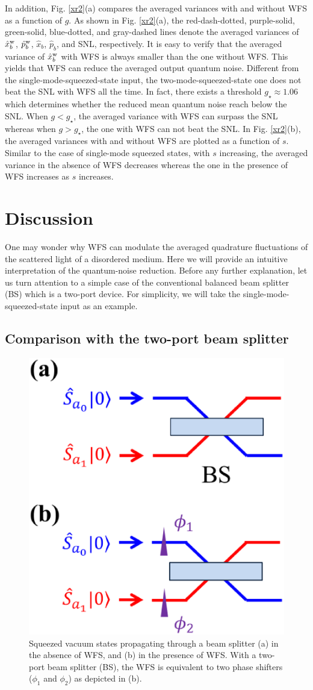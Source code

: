 \documentclass[9pt,twocolumn,twoside]{osajnl}
\begin{document}
In addition, Fig. \ref{xr2}(a) compares the averaged variances with and without WFS as a function of $g$. As shown in Fig. \ref{xr2}(a), the red-dash-dotted, purple-solid, green-solid, blue-dotted, and gray-dashed lines denote the averaged variances of $\hat{x}_b^{\rm{w}}$, $\hat{p}_b^{\rm{w}}$, $\hat{x}_b$, $\hat{p}_b$, and SNL, respectively. It is easy to verify that the averaged variance of $\hat{x}_b^{\rm{w}}$ with WFS is always smaller than the one without WFS. This yields that WFS can reduce the averaged output quantum noise. Different from the single-mode-squeezed-state input, the two-mode-squeezed-state one does not beat the SNL with WFS all the time. In fact, there exists a threshold $g_{\star} \approx 1.06$ which determines whether the reduced mean quantum noise reach below the SNL. When $g < g_{\star}$, the averaged variance with WFS can surpass the SNL whereas when $g > g_{\star}$, the one with WFS can not beat the SNL. In Fig. \ref{xr2}(b), the averaged variances with and without WFS are plotted as a function of $s$. Similar to the case of single-mode squeezed states, with $s$ increasing, the averaged variance in the absence of WFS decreases whereas the one in the presence of WFS increases as $s$ increases. 


\section{Discussion}

One may wonder why WFS can modulate the averaged quadrature fluctuations of the scattered light of a disordered medium. Here we will provide an intuitive interpretation of the quantum-noise reduction. Before any further explanation, let us turn attention to a simple case of the conventional balanced beam splitter (BS) which is a two-port device. For simplicity, we will take the single-mode-squeezed-state input as an example.

\subsection{Comparison with the two-port beam splitter}


\begin{figure}[htbp]
\begin{center}
\includegraphics[width=.4\textwidth]{02_20190613_BS.eps} {}
\end{center}
\caption{Squeezed vacuum states propagating through a beam splitter (a) in the absence of WFS, and (b) in the presence of WFS. With a two-port beam splitter (BS), the WFS is equivalent to two phase shifters ($\phi_1$ and $\phi_2$) as depicted in (b).}
\label{bs12}
\end{figure}
\end{document}
